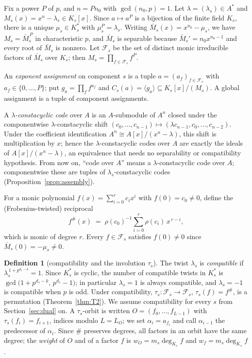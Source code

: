 \documentclass[11pt]{article}
\theoremstyle{definition}
\newtheorem{definition}[theorem]{Definition}
\theoremstyle{remark}
\begin{document}
Fix a power \(P\) of \(p\), and \(n = P n_0\) with
\(\gcd(n_0, p) = 1\). Let \(\lambda = (\lambda_s) \in A^*\) and
\(M_s(x) = x^n - \lambda_s \in K_s[x]\). Since \(a \mapsto a^P\) is a
bijection of the finite field \(K_s\), there is a unique \(\mu_s \in K_s^*\)
with \(\mu_s^P = \lambda_s\). Writing \(\bar M_s(x) = x^{n_0} - \mu_s\), we
have \(M_s = \bar M_s^{\,P}\) in characteristic \(p\), and \(\bar M_s\) is
separable because \(\bar M_s' = n_0 x^{n_0-1}\) and every root of
\(\bar M_s\) is nonzero. Let \(\mathcal{F}_s\) be the set of distinct
monic irreducible factors of \(\bar M_s\) over \(K_s\); then
\(M_s = \prod_{f \in \mathcal{F}_s} f^P\).

An \emph{exponent assignment} on component \(s\) is a tuple
\(a = (a_f)_{f \in \mathcal{F}_s}\) with \(a_f \in \{0, \dots, P\}\); put
\(g_a = \prod_f f^{a_f}\) and \(C_s(a) = \langle g_a \rangle \subseteq
K_s[x]/(M_s)\). A global assignment is a tuple of component assignments.

A \emph{\(\lambda\)-constacyclic code} over \(A\) is an \(A\)-submodule of
\(A^n\) closed under the componentwise \(\lambda\)-constacyclic shift
\((c_0,\dots,c_{n-1}) \mapsto (\lambda c_{n-1}, c_0, \dots, c_{n-2})\).
Under the coefficient identification \(A^n \cong A[x]/(x^n-\lambda)\), this
shift is multiplication by \(x\); hence the \(\lambda\)-constacyclic codes
over \(A\) are exactly the ideals of \(A[x]/(x^n-\lambda)\), an equivalence
that needs no separability or compatibility hypothesis. From now on,
``code over \(A\)'' means a \(\lambda\)-constacyclic code over \(A\);
componentwise these are tuples of \(\lambda_s\)-constacyclic codes
(Proposition~\ref{prop:assembly}).

For a monic polynomial \(f(x) = \sum_{i=0}^{r} c_i x^i\) with
\(f(0) = c_0 \ne 0\), define the (Frobenius-twisted) reciprocal
\[
f^{\#}(x) \;=\; \rho(c_0)^{-1} \sum_{i=0}^{r} \rho(c_i)\, x^{\,r-i},
\]
which is monic of degree \(r\). Every \(f \in \mathcal{F}_s\) satisfies
\(f(0) \ne 0\) since \(\bar M_s(0) = -\mu_s \ne 0\).

\begin{definition}[compatibility and the involution \(\tau_s\)]
The twist \(\lambda_s\) is \emph{compatible} if
\(\lambda_s^{\,1 + p^{d_s - k}} = 1\). Since \(K_s^*\) is cyclic, the
number of compatible twists in \(K_s^*\) is
\(\gcd\big(1 + p^{d_s-k},\, p^{d_s} - 1\big)\); in particular
\(\lambda_s = 1\) is always compatible, and \(\lambda_s = -1\) is
compatible when \(p\) is odd.
Under compatibility, \(\tau_s : \mathcal{F}_s \to \mathcal{F}_s\),
\(\tau_s(f) = f^{\#}\), is a permutation (Theorem~\ref{thm:T2}). We
assume compatibility for every \(s\) from Section~\ref{sec:dual} on.
A \(\tau_s\)-orbit is written \(O = (f_0, \dots, f_{L-1})\) with
\(\tau_s(f_i) = f_{i+1}\), indices modulo \(L = L_O\); we set
\(\alpha_i = a_{f_i}\) and call \(\alpha_{i-1}\) the predecessor of
\(\alpha_i\). Since \(\#\) preserves degrees, all factors in an orbit
have the same degree; the \emph{weight} of \(O\) and of a factor \(f\) is
\(w_O = m_s \deg_{K_s} f\) and \(w_f = m_s \deg_{K_s} f\).
\end{definition}
\end{document}
